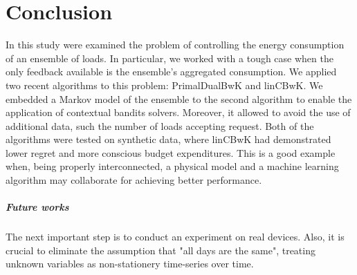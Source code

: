 \chapter{Conclusion}
In this study were examined the problem of controlling the energy consumption of an ensemble of loads. In particular, we worked with a tough case when the only feedback available is the ensemble's aggregated consumption. We applied two recent algorithms to this problem: PrimalDualBwK and linCBwK. We embedded a Markov model of the ensemble to the second algorithm to enable the application of contextual bandits solvers. Moreover, it allowed to avoid the use of additional data, such the number of loads accepting request. Both of the algorithms were tested on synthetic data, where linCBwK had demonstrated lower regret and more conscious budget expenditures. This is a good example when, being properly interconnected, a physical model and a machine learning algorithm may collaborate for achieving better performance.

\paragraph{Future works} The next important step is to conduct an experiment on real devices. Also, it is crucial to eliminate the assumption that "all days are the same", treating unknown variables as non-stationery time-series over time. 
